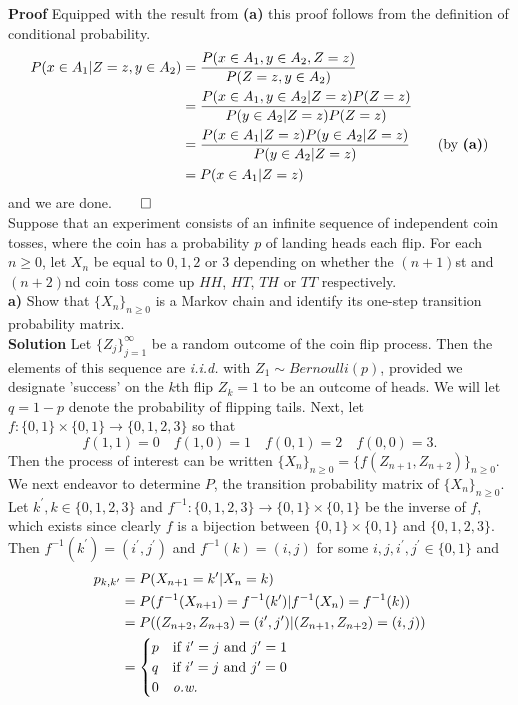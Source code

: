 \documentclass[11pt, letterpaper]{article}
\begin{document}
    {\bf Proof} Equipped with the result from {\bf (a)} this proof follows from the definition of conditional probability. 
    \begin{align*}
        P(x\in A_1|Z=z,y\in A_2)&=\frac{P(x\in A_1,y\in A_2,Z=z)}{P(Z=z,y\in A_2)}\\
        &=\frac{P(x\in A_1,y\in A_2|Z=z)P(Z=z)}{P(y\in A_2|Z=z)P(Z=z)}\\
        &=\frac{P(x\in A_1|Z=z)P(y\in A_2|Z=z)}{P(y\in A_2|Z=z)}\tag{by {\bf (a)}}\\
        &=P(x\in A_1|Z=z)
    \end{align*}
    and we are done.\hfill{$\qed$}\\[10pt]
     Suppose that an experiment consists of an infinite sequence of independent coin tosses, where the coin has
    a probability $p$ of landing heads each flip. For each $n\geq 0$, let $X_n$ be equal to $0,1,2$ or $3$ depending on whether the $(n+1)$st and $(n+2)$nd coin toss
    come up $HH$, $HT$, $TH$ or $TT$ respectively.\\[10pt]
    {\bf a)} Show that $\{X_n\}_{n\geq 0}$ is a Markov chain and identify its one-step transition probability matrix.\\[10pt]
    {\bf Solution} Let $\{Z_j\}_{j=1}^\infty$ be a random outcome of the coin flip process. Then the elements of this sequence are {\it i.i.d.} with $Z_1\sim Bernoulli(p)$, provided
    we designate  'success' on the $k$th flip $Z_k=1$ to be an outcome of heads. We will let $q=1-p$ denote the probability of flipping tails. Next, let $f:\{0,1\}\times\{0,1\}\rightarrow\{0,1,2,3\}$ so that
    \[f(1,1)=0\quad f(1,0)=1\quad f(0,1)=2\quad f(0,0)=3.\]
    Then the process of interest can be written $\{X_n\}_{n\geq 0}=\{f(Z_{n+1},Z_{n+2})\}_{n\geq 0}$.\\[10pt] 
    We next endeavor to determine $P$, the transition probability matrix of $\{X_n\}_{n\geq 0}$. Let $k^\prime,k\in\{0,1,2,3\}$ and $f^{-1}:\{0,1,2,3\}\rightarrow\{0,1\}\times\{0,1\}$ be the inverse of $f$,
    which exists since clearly $f$ is a bijection between $\{0,1\}\times\{0,1\}$ and $\{0,1,2,3\}$. Then $f^{-1}(k^\prime)=(i^\prime,j^\prime)$ and $f^{-1}(k)=(i,j)$ for some $i,j,i^\prime,j^\prime\in\{0,1\}$ and
    \begin{align*}
        p_{k,k^\prime}&=P(X_{n+1}=k^\prime|X_n=k)\\
        &=P(f^{-1}(X_{n+1})=f^{-1}(k^\prime)|f^{-1}(X_n)=f^{-1}(k))\\
        &=P((Z_{n+2},Z_{n+3})=(i^\prime,j^\prime)|(Z_{n+1},Z_{n+2})=(i,j))\\
        &=\begin{cases}
            p\quad\text{if $i^\prime=j$ and $j^\prime=1$}\\
            q\quad\text{if $i^\prime=j$ and $j^\prime=0$}\\
            0\quad\text{{\it o.w.}}
        \end{cases}
    \end{align*}
\end{document}

